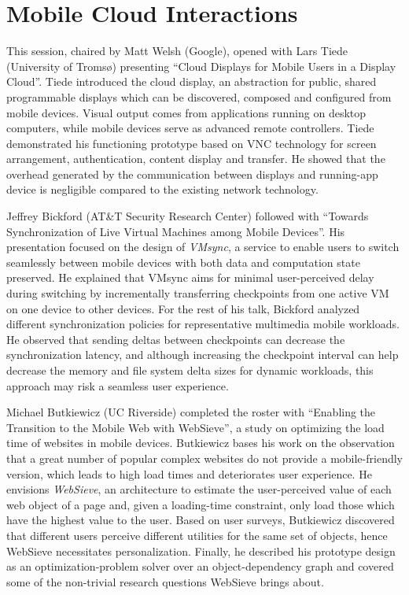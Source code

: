 \section{Mobile Cloud Interactions}
\label{sec:mobilecloud}

This session, chaired by Matt Welsh (Google), opened with Lars Tiede
(University of Tromsø) presenting ``Cloud Displays for Mobile Users in a
Display Cloud''. Tiede introduced the cloud display, an abstraction for
public, shared programmable displays which can be discovered, composed
and configured from mobile devices. Visual output comes from
applications running on desktop computers, while mobile devices serve as
advanced remote controllers. Tiede demonstrated his functioning
prototype based on VNC technology for screen arrangement,
authentication, content display and transfer. He showed that the
overhead generated by the communication between displays and running-app
device is negligible compared to the existing network technology.

Jeffrey Bickford (AT\&T Security Research Center) followed with
``Towards Synchronization of Live Virtual Machines among Mobile
Devices''. His presentation focused on the design of \emph{VMsync}, a
service to enable users to switch seamlessly between mobile devices
with both data and computation state preserved. He explained that VMsync
aims for minimal user-perceived delay during switching by incrementally
transferring checkpoints from one active VM on one device to other
devices. For the rest of his talk, Bickford analyzed different
synchronization policies for representative multimedia mobile workloads.
He observed that sending deltas between checkpoints can decrease the
synchronization latency, and although increasing the checkpoint interval
can help decrease the memory and file system delta sizes for dynamic
workloads, this approach may risk a seamless user experience.

Michael Butkiewicz (UC Riverside) completed the roster with ``Enabling
the Transition to the Mobile Web with WebSieve'', a study on optimizing
the load time of websites in mobile devices. Butkiewicz bases his work
on the observation that a great number of popular complex websites do
not provide a mobile-friendly version, which leads to high load times
and deteriorates user experience. He envisions \emph{WebSieve}, an
architecture to estimate the user-perceived value of each web object of
a page and, given a loading-time constraint, only load those which have
the highest value to the user. Based on user surveys, Butkiewicz
discovered that different users perceive different utilities for the
same set of objects, hence WebSieve necessitates personalization.
Finally, he described his prototype design as an optimization-problem
solver over an object-dependency graph and covered some of the
non-trivial research questions WebSieve brings about.

